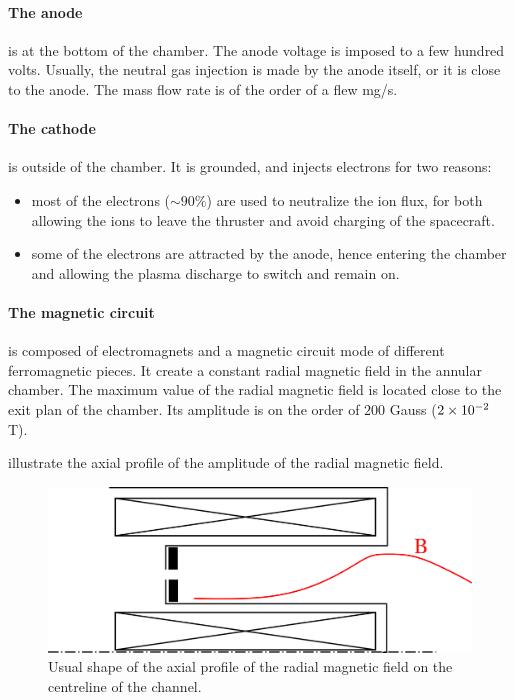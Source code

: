 \paragraph{The anode} is at the bottom of the chamber.
The anode voltage is imposed to a few hundred volts.
Usually, the neutral gas injection is made by the anode itself, or it is close to the anode.
The mass flow rate is of the order of a flew mg/s.

\paragraph{The cathode} is outside of the chamber.
It is grounded, and injects electrons for two reasons\string:
\begin{itemize}
  \item most of the electrons ($\sim 90 \%$) are used to neutralize the ion flux, for both allowing the ions to leave the thruster and avoid charging of the spacecraft.
  \item some of the electrons are attracted by the anode, hence entering the chamber and allowing the plasma discharge to switch and remain on.
\end{itemize}

\paragraph{The magnetic circuit} is composed of electromagnets and a magnetic circuit mode of different ferromagnetic pieces.
It create a constant radial magnetic field in the annular chamber.
The maximum value of the radial magnetic field is located close to the exit plan of the chamber.
Its amplitude is on the order of $200$ Gauss (${2}\times 10^{-2}$ T).

 illustrate the axial profile of the amplitude of the radial magnetic field.
\begin{figure}[hbtp]
  \centering
  \includegraphics[width=\defaultwidth]{bshape}
  \caption{Usual shape of the axial profile of the radial magnetic field on the centreline of the channel.}
  \label{fig-bshape}
\end{figure}


